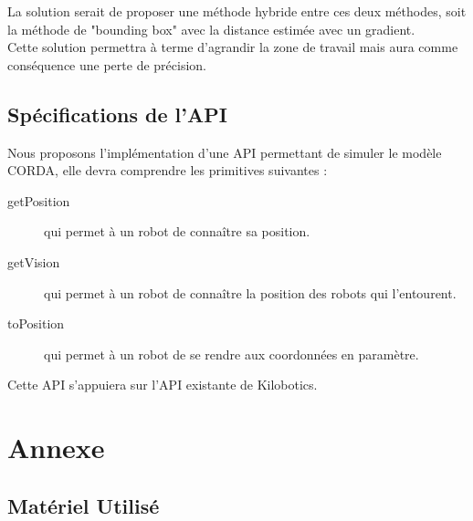\documentclass[a4paper,8pt]{report}
\begin{document}
\smallskip
La solution serait de proposer une m\'ethode hybride entre ces deux m\'ethodes, soit la m\'ethode de "bounding box" avec la distance estim\'ee avec un gradient.\\
Cette solution permettra \`a terme d'agrandir la zone de travail mais aura comme cons\'equence une perte de pr\'ecision.\\


\section*{Sp\'ecifications de l'API}\label{sec:name}

Nous proposons l'impl\'ementation d'une API permettant de simuler le mod\`ele CORDA, elle devra comprendre les primitives suivantes :

\begin{description}
\item[getPosition] qui permet \`a un robot de conna\^itre sa position.
\item[getVision] qui permet \`a un robot de conna\^itre la position des robots qui l'entourent.
\item[toPosition] qui permet \`a un robot de se rendre aux coordonn\'ees en param\`etre.
\end{description}

\smallskip
Cette API s'appuiera sur l'API existante de Kilobotics.\\


\chapter{Annexe}

\section*{Mat\'eriel Utilis\'e}\label{sec:name}
\end{document}
